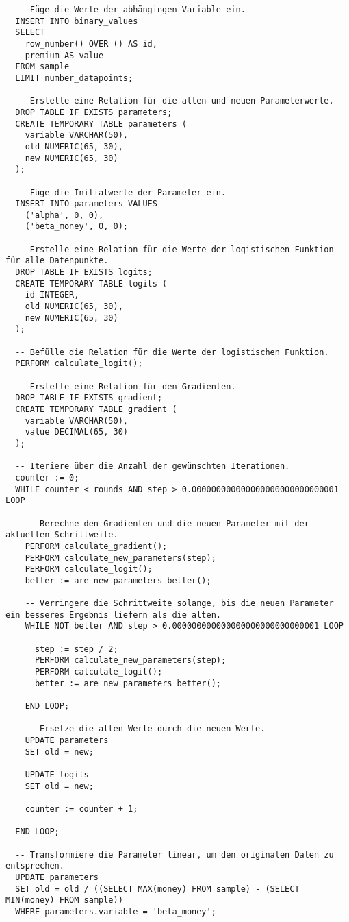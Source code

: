\begin{verbatim}
  -- Füge die Werte der abhängingen Variable ein.
  INSERT INTO binary_values
  SELECT
    row_number() OVER () AS id,
    premium AS value
  FROM sample
  LIMIT number_datapoints;

  -- Erstelle eine Relation für die alten und neuen Parameterwerte.
  DROP TABLE IF EXISTS parameters;
  CREATE TEMPORARY TABLE parameters (
    variable VARCHAR(50),
    old NUMERIC(65, 30),
    new NUMERIC(65, 30)
  );

  -- Füge die Initialwerte der Parameter ein.
  INSERT INTO parameters VALUES
    ('alpha', 0, 0),
    ('beta_money', 0, 0);

  -- Erstelle eine Relation für die Werte der logistischen Funktion für alle Datenpunkte.
  DROP TABLE IF EXISTS logits;
  CREATE TEMPORARY TABLE logits (
    id INTEGER,
    old NUMERIC(65, 30),
    new NUMERIC(65, 30)
  );

  -- Befülle die Relation für die Werte der logistischen Funktion.
  PERFORM calculate_logit();

  -- Erstelle eine Relation für den Gradienten.
  DROP TABLE IF EXISTS gradient;
  CREATE TEMPORARY TABLE gradient (
    variable VARCHAR(50),
    value DECIMAL(65, 30)
  );

  -- Iteriere über die Anzahl der gewünschten Iterationen.
  counter := 0;
  WHILE counter < rounds AND step > 0.000000000000000000000000000001 LOOP

    -- Berechne den Gradienten und die neuen Parameter mit der aktuellen Schrittweite.
    PERFORM calculate_gradient();
    PERFORM calculate_new_parameters(step);
    PERFORM calculate_logit();
    better := are_new_parameters_better();

    -- Verringere die Schrittweite solange, bis die neuen Parameter ein besseres Ergebnis liefern als die alten.
    WHILE NOT better AND step > 0.000000000000000000000000000001 LOOP

      step := step / 2;
      PERFORM calculate_new_parameters(step);
      PERFORM calculate_logit();
      better := are_new_parameters_better();

    END LOOP;

    -- Ersetze die alten Werte durch die neuen Werte.
    UPDATE parameters
    SET old = new;

    UPDATE logits
    SET old = new;

    counter := counter + 1;

  END LOOP;

  -- Transformiere die Parameter linear, um den originalen Daten zu entsprechen.
  UPDATE parameters
  SET old = old / ((SELECT MAX(money) FROM sample) - (SELECT MIN(money) FROM sample))
  WHERE parameters.variable = 'beta_money';


\end{verbatim}
